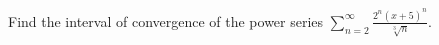 \documentclass{ximera}
\begin{document}
\begin{question}%

Find the interval of convergence of the power series \(\displaystyle \sum_{n=2}^\infty \frac{2^n (x+5)^n}{\sqrt[3]{n}}\).
\begin{multiplechoice}
\choice[correct]{\(\displaystyle \left[ -\frac{11}{2}, -\frac{9}{2} \right)\)}
\choice{\(\displaystyle \left[ \frac{9}{2}, \frac{11}{2} \right)\)}
\end{multiplechoice}

\end{question}
\end{document}
